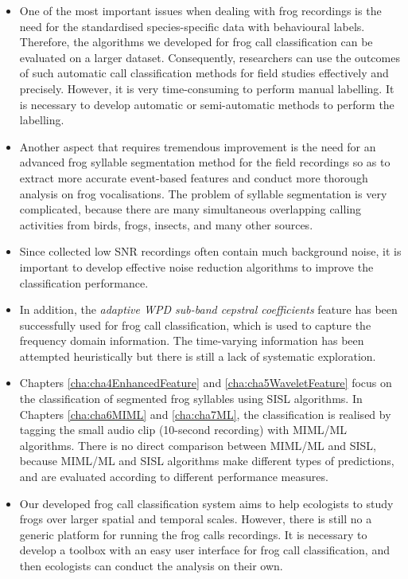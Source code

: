 \begin{itemize}
\item  One of the most important issues when dealing with frog recordings is the need for the standardised species-specific data with behavioural labels. 
Therefore, the algorithms we developed for frog call classification can be evaluated on a larger dataset. Consequently, researchers can use the outcomes of such automatic call classification methods for field studies effectively and precisely. However, it is very time-consuming to perform manual labelling. It is necessary to develop automatic or semi-automatic methods to perform the labelling.

\item  Another aspect that requires tremendous improvement is the need for an advanced frog syllable segmentation method for the field recordings so as to extract more accurate event-based features and conduct more thorough analysis on frog vocalisations. The problem of syllable segmentation is very complicated, because there are many simultaneous overlapping calling activities from birds, frogs, insects, and many other sources. 

\item Since collected low SNR recordings often contain much background noise, it is important to develop effective noise reduction algorithms to improve the classification performance.




\item In addition, the \textit{adaptive WPD sub-band cepstral coefficients} feature has been successfully used for frog call classification, which is used to capture the frequency domain information. The time-varying information has been attempted heuristically but there is still a lack of systematic exploration. 



\item Chapters \ref{cha:cha4EnhancedFeature} and \ref{cha:cha5WaveletFeature} focus on the classification of segmented frog syllables using SISL algorithms. In Chapters \ref{cha:cha6MIML} and \ref{cha:cha7ML}, the classification is realised by tagging the small audio clip (10-second recording) with MIML/ML algorithms. There is no direct comparison between MIML/ML and SISL, because MIML/ML and SISL algorithms make different types of predictions, and are evaluated according to different performance measures.



\item Our developed frog call classification system aims to help ecologists to study frogs over larger spatial and temporal scales. However, there is still no a generic platform for running the frog calls recordings. It is necessary to develop a toolbox with an easy user interface for frog call classification, and then ecologists can conduct the analysis on their own. 



\end{itemize}
